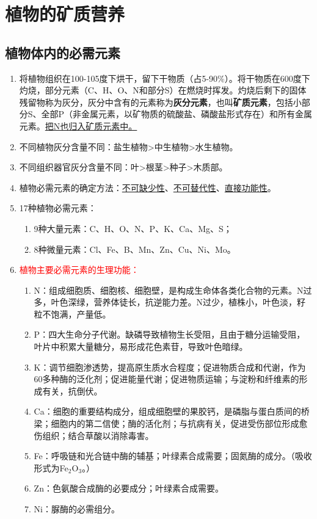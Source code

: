 \chapter{植物的矿质营养}
\section{植物体内的必需元素}
\begin{enumerate}
    \item 将植物组织在100-105度下烘干，留下干物质（占5-90\%）。将干物质在600度下灼烧，部分元素（C、H、O、N和部分S）在燃烧时挥发。灼烧后剩下的固体残留物称为灰分，灰分中含有的元素称为\textbf{灰分元素}，也叫\textbf{矿质元素}，包括小部分S、全部P（非金属元素，以矿物质的硫酸盐、磷酸盐形式存在）和所有金属元素。\uline{把N也归入矿质元素中。}
    \item 不同植物灰分含量不同：盐生植物>中生植物>水生植物。
    \item 不同组织器官灰分含量不同：叶>根茎>种子>木质部。
    \item 植物必需元素的确定方法：\uline{不可缺少性}、\uline{不可替代性}、\uline{直接功能性}。
    \item 17种植物必需元素：
    \begin{enumerate}
        \item 9种大量元素：C、H、O、N、P、K、Ca、Mg、S；
        \item 8种微量元素：Cl、Fe、B、Mn、Zn、Cu、Ni、Mo。
    \end{enumerate}
    \item \textcolor{red}{植物主要必需元素的生理功能：}
    \begin{enumerate}
        \item N：组成细胞质、细胞核、细胞壁，是构成生命体各类化合物的元素。N过多，叶色深绿，营养体徒长，抗逆能力差。N过少，植株小，叶色淡，籽粒不饱满，产量低。
        \item P：四大生命分子代谢。缺磷导致植物生长受阻，且由于糖分运输受阻，叶片中积累大量糖分，易形成花色素苷，导致叶色暗绿。
        \item K：调节细胞渗透势，提高原生质水合程度；促进物质合成和代谢，作为60多种酶的泛化剂；促进能量代谢；促进物质运输；与淀粉和纤维素的形成有关，抗倒伏。
        \item Ca：细胞的重要结构成分，组成细胞壁的果胶钙，是磷脂与蛋白质间的桥梁；细胞内的第二信使；酶的活化剂；与抗病有关，促进受伤部位形成愈伤组织；结合草酸以消除毒害。
        \item Fe：呼吸链和光合链中酶的辅基；叶绿素合成需要；固氮酶的成分。（吸收形式为Fe$_2$O$_3$。）
        \item Zn：色氨酸合成酶的必要成分；叶绿素合成需要。
        \item Ni：脲酶的必需组分。
    \end{enumerate}
\end{enumerate}

